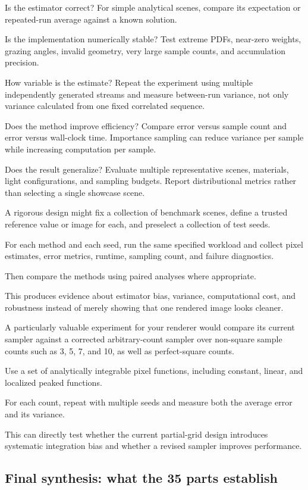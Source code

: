 Is the estimator correct? For simple analytical scenes, compare its expectation or repeated-run average against a known solution.

Is the implementation numerically stable? Test extreme PDFs, near-zero weights, grazing angles, invalid geometry, very large sample counts, and accumulation precision.

How variable is the estimate? Repeat the experiment using multiple independently generated streams and measure between-run variance, not only variance calculated from one fixed correlated sequence.

Does the method improve efficiency? Compare error versus sample count and error versus wall-clock time. Importance sampling can reduce variance per sample while increasing computation per sample.

Does the result generalize? Evaluate multiple representative scenes, materials, light configurations, and sampling budgets. Report distributional metrics rather than selecting a single showcase scene.

A rigorous design might fix a collection of benchmark scenes, define a trusted reference value or image for each, and preselect a collection of test seeds.

For each method and each seed, run the same specified workload and collect pixel estimates, error metrics, runtime, sampling count, and failure diagnostics.

Then compare the methods using paired analyses where appropriate.

This produces evidence about estimator bias, variance, computational cost, and robustness instead of merely showing that one rendered image looks cleaner.

A particularly valuable experiment for your renderer would compare its current sampler against a corrected arbitrary-count sampler over non-square sample counts such as 3, 5, 7, and 10, as well as perfect-square counts.

Use a set of analytically integrable pixel functions, including constant, linear, and localized peaked functions.

For each count, repeat with multiple seeds and measure both the average error and its variance.

This can directly test whether the current partial-grid design introduces systematic integration bias and whether a revised sampler improves performance.

\subsection{Final synthesis: what the 35 parts establish}\label{02-foundations-ii-ch031-final-synthesis-what-the-35-parts-establish}


